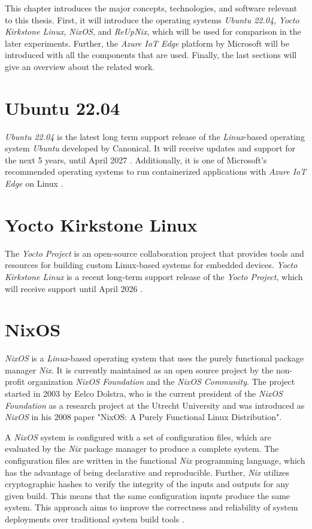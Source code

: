 This chapter introduces the major concepts, technologies,
and software relevant to this thesis. First, it will introduce the operating
systems \textit{Ubuntu 22.04}, \textit{Yocto Kirkstone Linux}, \textit{NixOS},
and \textit{ReUpNix}, which will be used for comparison in the later experiments.
Further, the \textit{Azure IoT Edge} platform by Microsoft will be introduced
with all the components that are used.
Finally, the last sections will give an overview about the related work.

\section{Ubuntu 22.04}
\textit{Ubuntu 22.04} is the latest long term support release of the
\textit{Linux}-based operating system \textit{Ubuntu} developed by Canonical.
It will receive updates and support for the next 5 years, until April
2027 \cite{ubuntu-releasenote}. Additionally, it is one of Microsoft's
recommended operating systems to run containerized applications with
\textit{Azure IoT Edge} on Linux \cite{msdoc-supportetplatforms}.

\section{Yocto Kirkstone Linux}
The \textit{Yocto Project} is an open-source collaboration project that provides tools
and resources for building custom Linux-based systems for embedded devices.
\textit{Yocto Kirkstone Linux} is a recent long-term support release of the
\textit{Yocto Project}, which will receive support until April 2026 \cite{yocto-releases}.

\section{NixOS}
\textit{NixOS} is a \textit{Linux}-based operating system that uses the purely
functional package manager \textit{Nix}. It is currently maintained as
an open source project by the non-profit organization \textit{NixOS Foundation}
and the \textit{NixOS Community}. The project started in 2003 by Eelco Dolstra,
who is the current president of the \textit{NixOS Foundation} as
a research project at the Utrecht University \cite{dolstra2003} and was introduced
as \textit{NixOS} in his 2008 paper "NixOS: A Purely Functional Linux Distribution".

A \textit{NixOS} system is configured with a set of configuration files, which
are evaluated by the \textit{Nix} package manager to produce a complete system.
The configuration files are written in the functional \textit{Nix} programming language,
which has the advantage of being declarative and reproducible. Further, \textit{Nix}
utilizes cryptographic hashes to verify the integrity of the inputs and outputs
for any given build. This means that the same configuration inputs produce the
same system. This approach aims to improve the correctness and reliability of
system deployments over traditional system build tools \cite{dolstra2006}.

